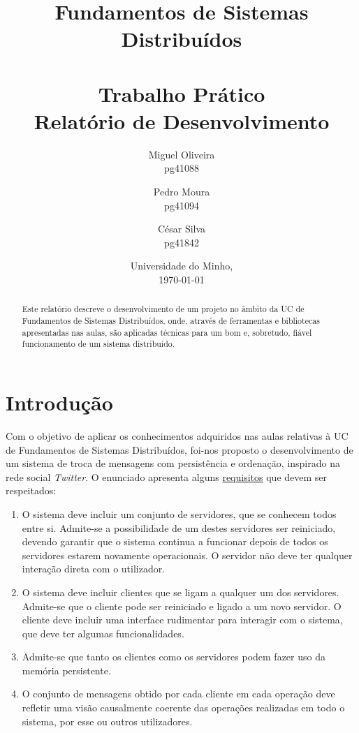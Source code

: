 \documentclass[12pt, a4paper]{report}
\begin{document}
\title{
    Fundamentos de Sistemas Distribuídos\\
    \textbf{\\Trabalho Prático}
    \large{\\Relatório de Desenvolvimento}
}

\author{
    Miguel Oliveira\\ pg41088
    \and Pedro Moura\\ pg41094
    \and César Silva\\ pg41842
}
\date{Universidade do Minho,\\\today}

\maketitle

\begin{abstract}
    Este relatório descreve o desenvolvimento de um projeto no âmbito da UC de Fundamentos de Sistemas Distribuídos, onde, através de ferramentas e bibliotecas apresentadas nas aulas, são aplicadas técnicas para um bom e, sobretudo, fiável funcionamento de um sistema distribuído.
\end{abstract}

\tableofcontents

\chapter{Introdução}
Com o objetivo de aplicar os conhecimentos adquiridos nas aulas relativas à UC de Fundamentos de Sistemas Distribuídos, foi-nos proposto o desenvolvimento de um sistema de troca de mensagens com persistência e ordenação, inspirado na rede social \textit{Twitter}.
O enunciado apresenta alguns \underline{requisitos} que devem ser respeitados:
\begin{enumerate}
    \item O sistema deve incluir um conjunto de servidores, que se conhecem todos entre si. Admite-se a possibilidade de um destes servidores ser reiniciado, devendo garantir que o sistema continua a funcionar depois de todos os servidores estarem novamente operacionais. O servidor não deve ter qualquer interação direta com o utilizador.
    \item O sistema deve incluir clientes que se ligam a qualquer um dos servidores. Admite-se que o cliente pode ser reiniciado e ligado a um novo servidor. O cliente deve incluir uma interface rudimentar para interagir com o sistema, que deve ter algumas funcionalidades.
    \item Admite-se que tanto os clientes como os servidores podem fazer uso da memória persistente.
    \item O conjunto de mensagens obtido por cada cliente em cada operação deve refletir uma visão causalmente coerente das operações realizadas em todo o sistema, por esse ou outros utilizadores.
    
\end{enumerate}
\end{document}
